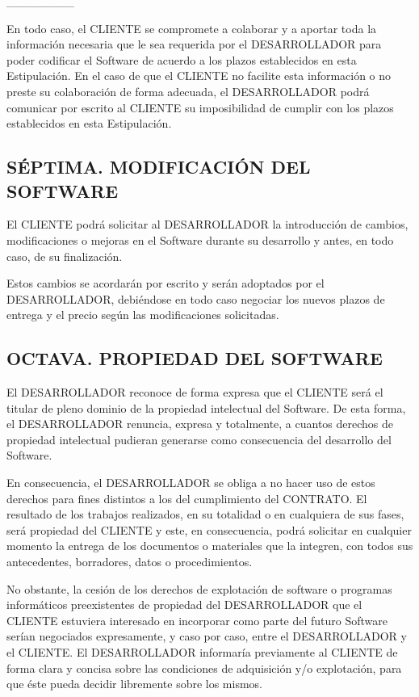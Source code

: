 \documentclass[a4paper,11pt]{report}
\begin{document}
	\_\_\_\_\_\_\_\_

	En todo caso, el CLIENTE se compromete a colaborar y a aportar toda la
	información necesaria que le sea requerida por el DESARROLLADOR para
	poder codificar el Software de acuerdo a los plazos establecidos en esta
	Estipulación. En el caso de que el CLIENTE no facilite esta información
	o no preste su colaboración de forma adecuada, el DESARROLLADOR podrá
	comunicar por escrito al CLIENTE su imposibilidad de cumplir con los
	plazos establecidos en esta Estipulación.

	\subsection*{SÉPTIMA. MODIFICACIÓN DEL SOFTWARE}

	El CLIENTE podrá solicitar al DESARROLLADOR la introducción de cambios,
	modificaciones o mejoras en el Software durante su desarrollo y antes,
	en todo caso, de su finalización.

	Estos cambios se acordarán por escrito y serán adoptados por el
	DESARROLLADOR, debiéndose en todo caso negociar los nuevos plazos de
	entrega y el precio según las modificaciones solicitadas.

	\subsection*{OCTAVA. PROPIEDAD DEL SOFTWARE}

	El DESARROLLADOR reconoce de forma expresa que el CLIENTE será el
	titular de pleno dominio de la propiedad intelectual del Software. De
	esta forma, el DESARROLLADOR renuncia, expresa y totalmente, a cuantos
	derechos de propiedad intelectual pudieran generarse como consecuencia
	del desarrollo del Software.

	En consecuencia, el DESARROLLADOR se obliga a no hacer uso de estos
	derechos para fines distintos a los del cumplimiento del CONTRATO. El
	resultado de los trabajos realizados, en su totalidad o en cualquiera de
	sus fases, será propiedad del CLIENTE y este, en consecuencia, podrá
	solicitar en cualquier momento la entrega de los documentos o materiales
	que la integren, con todos sus antecedentes, borradores, datos o
	procedimientos.

	No obstante, la cesión de los derechos de explotación de software o
	programas informáticos preexistentes de propiedad del DESARROLLADOR que
	el CLIENTE estuviera interesado en incorporar como parte del futuro
	Software serían negociados expresamente, y caso por caso, entre el
	DESARROLLADOR y el CLIENTE. El DESARROLLADOR informaría previamente al
	CLIENTE de forma clara y concisa sobre las condiciones de adquisición
	y/o explotación, para que éste pueda decidir libremente sobre los
	mismos.
\end{document}
